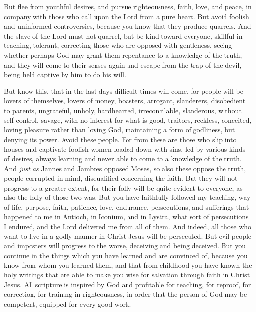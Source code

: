 \begin{biblechapter}
\verse But flee from youthful desires, and pursue righteousness, faith, love, and peace, in company with those who call upon the Lord from a pure heart.
\verse But avoid foolish and uninformed controversies, because you know that they produce quarrels.
\verse And the slave of the Lord must not quarrel, but be kind toward everyone, skillful in teaching, tolerant,
\verse correcting those who are opposed with gentleness, seeing whether perhaps God may grant them repentance to a knowledge of the truth,
\verse and they will come to their senses again and escape from the trap of the devil, being held captive by him to do his will.
\end{biblechapter}

\begin{biblechapter} %
 But know this, that in the last days difficult times will come,
\verse for people will be lovers of themselves, lovers of money, boasters, arrogant, slanderers, disobedient to parents, ungrateful, unholy,
\verse hardhearted, irreconcilable, slanderous, without self-control, savage, with no interest for what is good,
\verse traitors, reckless, conceited, loving pleasure rather than loving God,
\verse maintaining a form of godliness, but denying its power. Avoid these people.
\verse For from these are those who slip into houses and captivate foolish women loaded down with sins, led by various kinds of desires,
\verse always learning and never able to come to a knowledge of the truth.
\verse And \textit{just as} Jannes and Jambres opposed Moses, so also these oppose the truth, people corrupted in mind, disqualified concerning the faith.
\verse But they will not progress to a greater extent, for their folly will be quite evident to everyone, as also the folly of those two was.
 But you have faithfully followed my teaching, way of life, purpose, faith, patience, love, endurance,
\verse persecutions, and sufferings that happened to me in Antioch, in Iconium, and in Lystra, what sort of persecutions I endured, and the Lord delivered me from all of them.
\verse And indeed, all those who want to live in a godly manner in Christ Jesus will be persecuted.
\verse But evil people and imposters will progress to the worse, deceiving and being deceived.
\verse But you continue in the things which you have learned and are convinced of, because you know from whom you learned them,
\verse and that from childhood you have known the holy writings that are able to make you wise for salvation through faith in Christ Jesus.
\verse All scripture is inspired by God and profitable for teaching, for reproof, for correction, for training in righteousness,
\verse in order that the person of God may be competent, equipped for every good work.
\end{biblechapter}

